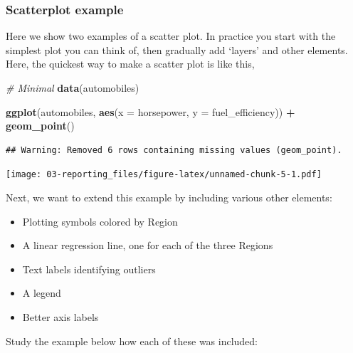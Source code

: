 \documentclass[]{book}
\newenvironment{Shaded}{\begin{snugshade}}{\end{snugshade}}
\newcommand{\CommentTok}[1]{\textcolor[rgb]{0.56,0.35,0.01}{\textit{#1}}}
\newcommand{\DataTypeTok}[1]{\textcolor[rgb]{0.13,0.29,0.53}{#1}}
\newcommand{\KeywordTok}[1]{\textcolor[rgb]{0.13,0.29,0.53}{\textbf{#1}}}
\newcommand{\NormalTok}[1]{#1}
\newcommand{\OperatorTok}[1]{\textcolor[rgb]{0.81,0.36,0.00}{\textbf{#1}}}
\newcommand{\StringTok}[1]{\textcolor[rgb]{0.31,0.60,0.02}{#1}}
\providecommand{\tightlist}{%
  \setlength{\itemsep}{0pt}\setlength{\parskip}{0pt}}
\begin{document}
\hypertarget{scatterplot-example}{%
\subsubsection{Scatterplot example}\label{scatterplot-example}}

Here we show two examples of a scatter plot. In practice you start with the simplest plot you can think of, then gradually add `layers' and other elements. Here, the quickest way to make a scatter plot is like this,

\begin{Shaded}
\begin{Highlighting}[]
\CommentTok{# Minimal}
\KeywordTok{data}\NormalTok{(automobiles)}

\KeywordTok{ggplot}\NormalTok{(automobiles, }\KeywordTok{aes}\NormalTok{(}\DataTypeTok{x =}\NormalTok{ horsepower, }\DataTypeTok{y =}\NormalTok{ fuel_efficiency)) }\OperatorTok{+}
\StringTok{  }\KeywordTok{geom_point}\NormalTok{()}
\end{Highlighting}
\end{Shaded}

\begin{verbatim}
## Warning: Removed 6 rows containing missing values (geom_point).
\end{verbatim}

\texttt{[image: 03-reporting\_files/figure-latex/unnamed-chunk-5-1.pdf]}

Next, we want to extend this example by including various other elements:

\begin{itemize}
\tightlist
\item
  Plotting symbols colored by Region
\item
  A linear regression line, one for each of the three Regions
\item
  Text labels identifying outliers
\item
  A legend
\item
  Better axis labels
\end{itemize}

Study the example below how each of these was included:
\end{document}
